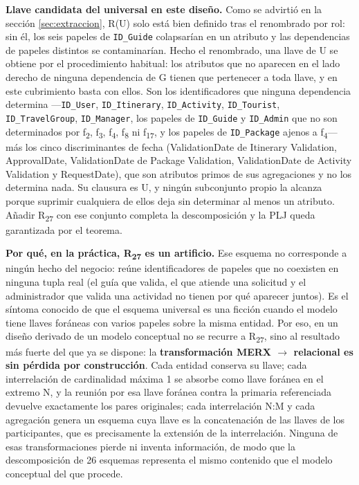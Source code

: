 \documentclass[11pt,a4paper]{article}
\begin{document}
\textbf{Llave candidata del universal en este diseño.} Como se advirtió en la sección \ref{sec:extraccion}, R(U) solo está bien definido tras el renombrado por rol: sin él, los seis papeles de \texttt{ID\_Guide} colapsarían en un atributo y las dependencias de papeles distintos se contaminarían. Hecho el renombrado, una llave de U se obtiene por el procedimiento habitual: los atributos que no aparecen en el lado derecho de ninguna dependencia de G tienen que pertenecer a toda llave, y en este cubrimiento basta con ellos. Son los identificadores que ninguna dependencia determina —\texttt{ID\_User}, \texttt{ID\_Itinerary}, \texttt{ID\_Activity}, \texttt{ID\_Tourist}, \texttt{ID\_TravelGroup}, \texttt{ID\_Manager}, los papeles de \texttt{ID\_Guide} y \texttt{ID\_Admin} que no son determinados por f\textsubscript{2}, f\textsubscript{3}, f\textsubscript{4}, f\textsubscript{8} ni f\textsubscript{17}, y los papeles de \texttt{ID\_Package} ajenos a f\textsubscript{4}— más los cinco discriminantes de fecha (ValidationDate de Itinerary Validation, ApprovalDate, ValidationDate de Package Validation, ValidationDate de Activity Validation y RequestDate), que son atributos primos de sus agregaciones y no los determina nada. Su clausura es U, y ningún subconjunto propio la alcanza porque suprimir cualquiera de ellos deja sin determinar al menos un atributo. Añadir R\textsubscript{27} con ese conjunto completa la descomposición y la PLJ queda garantizada por el teorema.

\textbf{Por qué, en la práctica, R\textsubscript{27} es un artificio.} Ese esquema no corresponde a ningún hecho del negocio: reúne identificadores de papeles que no coexisten en ninguna tupla real (el guía que valida, el que atiende una solicitud y el administrador que valida una actividad no tienen por qué aparecer juntos). Es el síntoma conocido de que el esquema universal es una ficción cuando el modelo tiene llaves foráneas con varios papeles sobre la misma entidad. Por eso, en un diseño derivado de un modelo conceptual no se recurre a R\textsubscript{27}, sino al resultado más fuerte del que ya se dispone: la \textbf{transformación MERX \ensuremath{\rightarrow} relacional es sin pérdida por construcción}. Cada entidad conserva su llave; cada interrelación de cardinalidad máxima 1 se absorbe como llave foránea en el extremo N, y la reunión por esa llave foránea contra la primaria referenciada devuelve exactamente los pares originales; cada interrelación N:M y cada agregación genera un esquema cuya llave es la concatenación de las llaves de los participantes, que es precisamente la extensión de la interrelación. Ninguna de esas transformaciones pierde ni inventa información, de modo que la descomposición de 26 esquemas representa el mismo contenido que el modelo conceptual del que procede.
\end{document}
